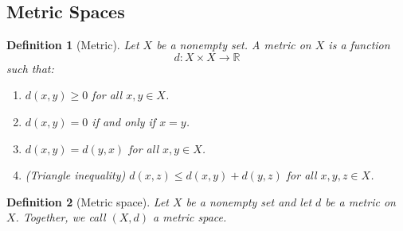 \documentclass[12pt]{article}
\newtheorem{definition}{Definition}
\begin{document}
\subsection*{Metric Spaces}

\begin{definition}[Metric]
Let $X$ be a nonempty set. A metric on $X$ is a function
\[
d:X\times X\to \mathbb{R}
\]
such that:
\begin{enumerate}[label=\textbf{(\arabic*)}]
\item $d(x,y)\ge 0$ for all $x,y\in X$.
\item $d(x,y)=0$ if and only if $x=y$.
\item $d(x,y)=d(y,x)$ for all $x,y\in X$.
\item (Triangle inequality) $d(x,z)\le d(x,y)+d(y,z)$ for all $x,y,z\in X$.
\end{enumerate}
\end{definition}

\begin{definition}[Metric space]
Let $X$ be a nonempty set and let $d$ be a metric on $X$. Together, we call
$(X,d)$ a metric space.
\end{definition}
\end{document}

